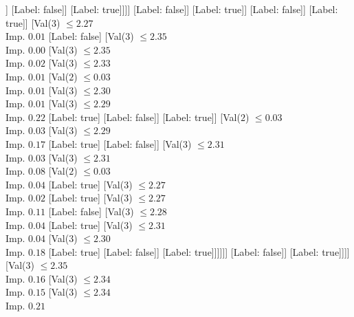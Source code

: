 \documentclass[margin=10pt]{standalone}
\begin{document}
\begin{forest}
																					]
																				[Label: false]]
																			[Label: true]]]]
																[Label: false]]
															[Label: true]]
														[Label: false]]
													[Label: true]]
												[Val($3$) $ \leq 2.27$ \\ Imp. $0.01$
													[Label: false]
													[Val($3$) $ \leq 2.35$ \\ Imp. $0.00$
														[Val($3$) $ \leq 2.35$ \\ Imp. $0.02$
															[Val($3$) $ \leq 2.33$ \\ Imp. $0.01$
																[Val($2$) $ \leq 0.03$ \\ Imp. $0.01$
																	[Val($3$) $ \leq 2.30$ \\ Imp. $0.01$
																		[Val($3$) $ \leq 2.29$ \\ Imp. $0.22$
																			[Label: true]
																			[Label: false]]
																		[Label: true]]
																	[Val($2$) $ \leq 0.03$ \\ Imp. $0.03$
																		[Val($3$) $ \leq 2.29$ \\ Imp. $0.17$
																			[Label: true]
																			[Label: false]]
																		[Val($3$) $ \leq 2.31$ \\ Imp. $0.03$
																			[Val($3$) $ \leq 2.31$ \\ Imp. $0.08$
																				[Val($2$) $ \leq 0.03$ \\ Imp. $0.04$
																					[Label: true]
																					[Val($3$) $ \leq 2.27$ \\ Imp. $0.02$
																						[Label: true]
																						[Val($3$) $ \leq 2.27$ \\ Imp. $0.11$
																							[Label: false]
																							[Val($3$) $ \leq 2.28$ \\ Imp. $0.04$
																								[Label: true]
																								[Val($3$) $ \leq 2.31$ \\ Imp. $0.04$
																									[Val($3$) $ \leq 2.30$ \\ Imp. $0.18$
																										[Label: true]
																										[Label: false]]
																									[Label: true]]]]]]
																				[Label: false]]
																			[Label: true]]]]
																[Val($3$) $ \leq 2.35$ \\ Imp. $0.16$
																	[Val($3$) $ \leq 2.34$ \\ Imp. $0.15$
																		[Val($3$) $ \leq 2.34$ \\ Imp. $0.21$

\end{forest}
\end{document}

